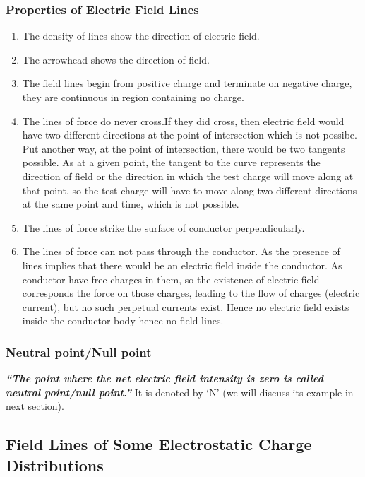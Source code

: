 \subsubsection{Properties of Electric Field Lines}
\begin{enumerate}[label=(\roman*)]
\item The density of lines show the direction of electric field.
\item The arrowhead shows the direction of field.
\item The field lines begin from positive charge and terminate on negative
charge, they are continuous in region containing no charge.
\item The lines of force do never cross.If they did cross,
then electric field would have two different directions at
the point of intersection which is not possibe.
Put another way, at the point of intersection,
there would be two tangents possible. As at a given point,
the tangent to the curve represents the direction of field or
the direction in which the test charge will move along at that point,
so the test charge will have to move along two different directions
at the same point and time, which is not possible.
\item The lines of force strike the surface of conductor perpendicularly.
\item The lines of force can not pass through the conductor. As the 
presence of lines implies that there would be an electric field
inside the conductor. As conductor have free charges in them,
so the existence of electric field corresponds the force on those charges,
leading to the flow of charges (electric current),
but no such perpetual currents exist. Hence no electric field exists
inside the conductor body hence no field lines.
\end{enumerate}
\subsubsection{Neutral point/Null point}
\textit{\textbf{“The point where the net electric field intensity
is zero is called neutral point/null point.”}}
It is denoted by `N’ (we will discuss its example in next section).
\subsection{Field Lines of Some Electrostatic Charge Distributions}
